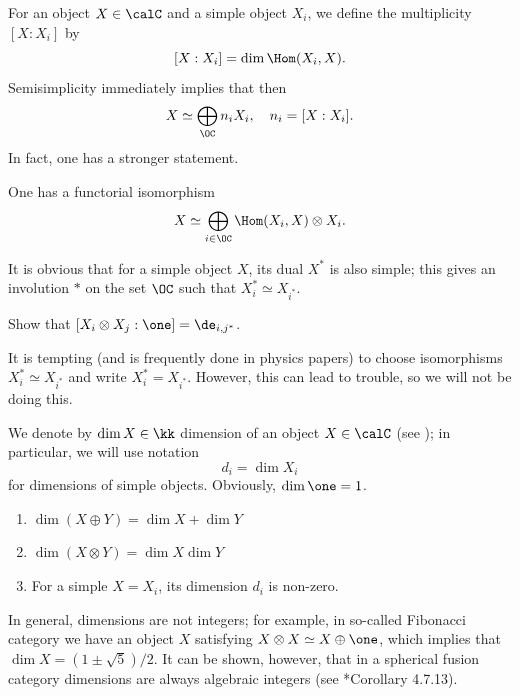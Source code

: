 For an object $X\in \calC$ and a simple object $X_i$, we define the multiplicity
$[X:X_i]$ by
$$
  [X:X_i]=\dim \Hom(X_i, X).
$$
Semisimplicity immediately implies
that then
$$
  X\simeq \bigoplus_{\OC} n_i X_i, \quad n_i = [X:X_i].
$$
In fact, one has a stronger statement.
\begin{lemma}\label{l:simple}
  One has a functorial isomorphism
  $$
    X\simeq \bigoplus_{i\in\OC} \Hom(X_i, X)\otimes X_i.
  $$
\end{lemma}

It is
obvious that for a simple object $X$, its dual $X^*$ is also simple; this gives
an involution $*$ on the set $\OC$ such that $X_i^*\simeq X_{i^*}$.

\begin{exercise}\label{ec:duality-spherical}
  Show that $[X_i\otimes X_j:\one]=\de_{i, j^*}$.
\end{exercise}

\begin{remark}
  It is tempting (and is frequently done in physics papers) to choose
  isomorphisms $X_{i}^*\simeq X_{i^*}$ and write $X_i^*=X_{i^*}$. However, this
  can lead to trouble, so we will not be doing this.
\end{remark}


We denote by $\dim X\in \kk$ dimension of an object $X\in \calC$ (see
); in particular, we will use notation
$$
d_i=\dim X_i
$$
for dimensions of simple objects. Obviously, $\dim \one =1$.

\begin{lemma}\label{l:dim-properties} \par\noindent
  \begin{enumerate}
    \item $\dim (X\oplus Y)= \dim X +\dim Y$
    \item $\dim (X\otimes Y)= \dim X \dim Y$
    \item For a simple $X=X_i$, its dimension $d_i$ is non-zero.
  \end{enumerate}
\end{lemma}

\begin{remark}
  In general, dimensions are not integers; for example, in so-called Fibonacci
  category we have an object $X$ satisfying $X\otimes X\simeq X\oplus \one$,
  which implies that $\dim X= (1\pm \sqrt{5})/2$. It can be shown, however, that
  in a spherical fusion category dimensions are always algebraic integers (see
  *{Corollary 4.7.13}).
\end{remark}


